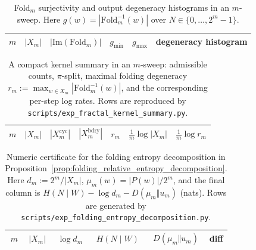 \begin{table}[H]
\centering
\scriptsize
\setlength{\tabcolsep}{4pt}
\renewcommand{\arraystretch}{1.15}
\begin{tabular}{rrrrrl}
\toprule
$m$ & $|X_m|$ & $|\mathrm{Im}(\mathrm{Fold}_m)|$ & $g_{\min}$ & $g_{\max}$ & degeneracy histogram \\
\midrule
%
\end{tabular}
\caption{Fold$_m$ surjectivity and output degeneracy histograms in an $m$-sweep. Here $g(w)=|\mathrm{Fold}_m^{-1}(w)|$ over $N\in\{0,\dots,2^m-1\}$.}
\label{tab:foldm_sweep}
\end{table}

\begin{table}[H]
\centering
\scriptsize
\setlength{\tabcolsep}{6pt}
\renewcommand{\arraystretch}{1.15}
\begin{tabular}{rrrrrrr}
\toprule
$m$ & $|X_m|$ & $|X_m^{\mathrm{cyc}}|$ & $|X_m^{\mathrm{bdry}}|$ & $r_m$ & $\frac{1}{m}\log|X_m|$ & $\frac{1}{m}\log r_m$ \\
\midrule
%
\end{tabular}
\caption{A compact kernel summary in an $m$-sweep: admissible counts, $\pi$-split, maximal folding degeneracy $r_m:=\max_{w\in X_m}|\mathrm{Fold}_m^{-1}(w)|$, and the corresponding per-step log rates. Rows are reproduced by \texttt{scripts/exp\_fractal\_kernel\_summary.py}.}
\label{tab:fractal_kernel_sweep}
\end{table}

\begin{table}[H]
\centering
\scriptsize
\setlength{\tabcolsep}{6pt}
\renewcommand{\arraystretch}{1.15}
\begin{tabular}{rrrrrr}
\toprule
$m$ & $|X_m|$ & $\log d_m$ & $H(N\mid W)$ & $D(\mu_m\Vert u_m)$ & diff \\
\midrule
%
\end{tabular}
\caption{Numeric certificate for the folding entropy decomposition in Proposition~\ref{prop:folding_relative_entropy_decomposition}. Here $d_m:=2^m/|X_m|$, $\mu_m(w)=|P(w)|/2^m$, and the final column is $H(N\mid W)-\log d_m-D(\mu_m\Vert u_m)$ (nats). Rows are generated by \texttt{scripts/exp\_folding\_entropy\_decomposition.py}.}
\label{tab:folding_entropy_decomposition}
\end{table}

